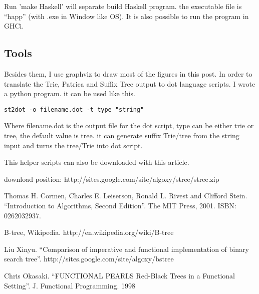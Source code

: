 \documentclass{article}
\begin{document}
Run 'make Haskell' will separate build Haskell program. the executable
file is ``happ'' (with .exe
in Window like OS). It is also possible to run the program in GHCi.

\subsection{Tools}

Besides them, I use graphviz to draw most of the figures in this post. In order to
translate the Trie, Patrica and Suffix Tree output to dot language scripts. I wrote a python program.
it can be used like this.

\begin{verbatim}
st2dot -o filename.dot -t type "string"
\end{verbatim}

Where filename.dot is the output file for the dot script, type can be
either trie or tree, the default value is tree. it can generate suffix
Trie/tree from the string input and turns the tree/Trie into dot script.

This helper scripts can also be downloaded with this article.

download position: http://sites.google.com/site/algoxy/stree/stree.zip

\begin{thebibliography}{99}

Thomas H. Cormen, Charles E. Leiserson, Ronald L. Rivest and Clifford Stein. ``Introduction to Algorithms, Second Edition''. The MIT Press, 2001. ISBN: 0262032937.

B-tree, Wikipedia. http://en.wikipedia.org/wiki/B-tree

Liu Xinyu. ``Comparison of imperative and functional implementation of
binary search tree''. http://sites.google.com/site/algoxy/bstree

Chris Okasaki. ``FUNCTIONAL PEARLS Red-Black Trees in a Functional Setting''. J. Functional Programming. 1998

\end{thebibliography}

\ifx\wholebook\relax \else
\end{document}
